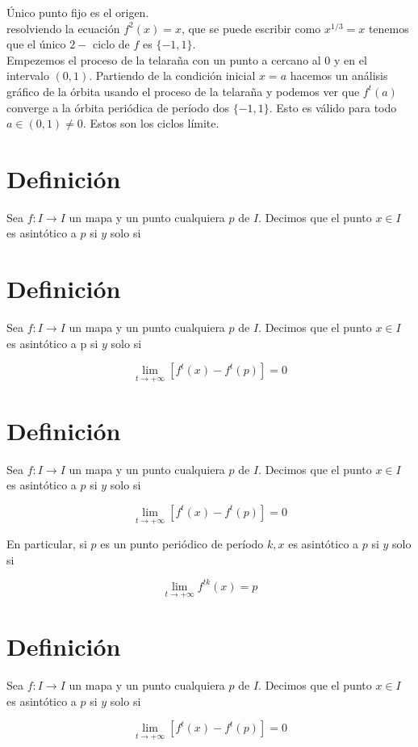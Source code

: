 \documentclass[11pt]{beamer}
\begin{document}
Único punto fijo es el origen.\\
resolviendo la ecuación $f^{2}(x)=x$, que se puede escribir como $x^{1 / 3}=x$ tenemos que el único $2-$ ciclo de $f$ es $\{-1,1\}$.\\
Empezemos el proceso de la telaraña con un punto a cercano al 0 y en el intervalo $(0,1)$. Partiendo de la condición inicial $x=a$ hacemos un análisis gráfico de la órbita usando el proceso de la telaraña y podemos ver que $f^{t}(a)$ converge a la órbita periódica de período dos $\{-1,1\}$. Esto es válido para todo $a \in(0,1) \neq 0$. Estos son los ciclos límite.

\section*{Definición}
Sea $f: I \rightarrow I$ un mapa y un punto cualquiera $p$ de $I$. Decimos que el punto $x \in I$ es asintótico a $p$ si $y$ solo si

\section*{Definición}
Sea $f: I \rightarrow I$ un mapa y un punto cualquiera $p$ de $I$. Decimos que el punto $x \in I$ es asintótico a p si $y$ solo si

$$
\lim _{t \rightarrow+\infty}\left[f^{t}(x)-f^{t}(p)\right]=0
$$

\section*{Definición}
Sea $f: I \rightarrow I$ un mapa y un punto cualquiera $p$ de $I$. Decimos que el punto $x \in I$ es asintótico a $p$ si $y$ solo si

$$
\lim _{t \rightarrow+\infty}\left[f^{t}(x)-f^{t}(p)\right]=0
$$

En particular, si $p$ es un punto periódico de período $k, x$ es asintótico a $p$ si $y$ solo si

$$
\lim _{t \rightarrow+\infty} f^{t k}(x)=p
$$

\section*{Definición}
Sea $f: I \rightarrow I$ un mapa y un punto cualquiera $p$ de $I$. Decimos que el punto $x \in I$ es asintótico a $p$ si $y$ solo si

$$
\lim _{t \rightarrow+\infty}\left[f^{t}(x)-f^{t}(p)\right]=0
$$
\end{document}
